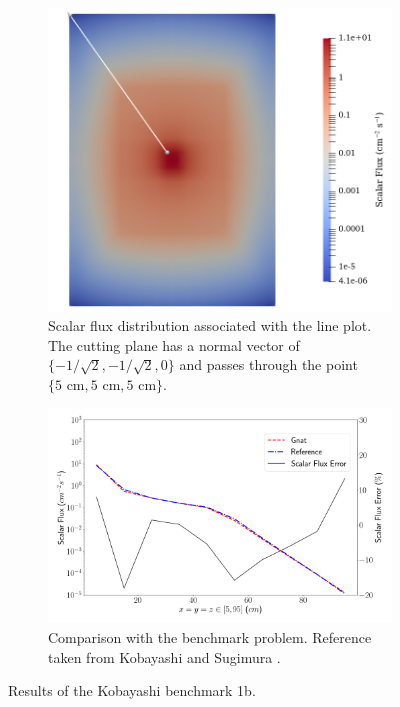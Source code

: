 \begin{figure}[H]
    \centering
    \begin{subfigure}[b]{0.4\textwidth}
        \centering
        \includegraphics[width=\textwidth]{images/verification/sn_kobayashi/1/kobayashi_1b_flux_map.png}
        \caption{Scalar flux distribution associated with the line plot. The cutting plane has a normal vector of $\{-1/\sqrt{2}, -1/\sqrt{2}, 0\}$ and passes through the point $\{5\text{ cm}, 5\text{ cm}, 5\text{ cm}\}$.}
        \label{fig:verification:sn_kobayashi_1b:flux}
    \end{subfigure}
    \hfill
    \begin{subfigure}[b]{0.59\textwidth}
        \centering
        \includegraphics[width=\textwidth]{images/verification/sn_kobayashi/1/kobayashi_1b.png}
        \caption{Comparison with the benchmark problem. Reference taken from Kobayashi and Sugimura \cite{kobayashi_benchmarks}.}
        \label{fig:verification:sn_kobayashi_1b:line_plot}
    \end{subfigure}
    \caption{Results of the Kobayashi benchmark 1b.}
    \label{fig:verification:sn_kobayashi_1b}
\end{figure}

